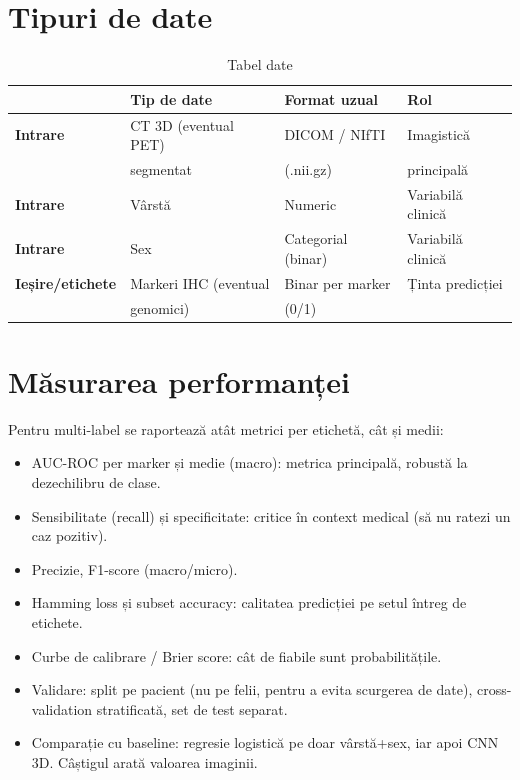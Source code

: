 \documentclass[runningheads,a4paper,11pt]{report}
\begin{document}
\section{Tipuri de date}
\begin{table}[htbp]
    \centering
    \renewcommand{\arraystretch}{1.5}
    \begin{tabular}{llll}
        \toprule
        & \textbf{Tip de date} & \textbf{Format uzual} & \textbf{Rol} \\
        \midrule
        \textbf{Intrare} & CT 3D (eventual PET) & DICOM / NIfTI & Imagistică \\
                         & segmentat            & (.nii.gz)     & principală \\
        \midrule
        \textbf{Intrare} & Vârstă               & Numeric       & Variabilă clinică \\
        \midrule
        \textbf{Intrare} & Sex                  & Categorial (binar) & Variabilă clinică \\
        \midrule
        \textbf{Ieșire/etichete} & Markeri IHC (eventual & Binar per marker & Ținta predicției \\
                                 & genomici)             & (0/1)            & \\
        \bottomrule
    \end{tabular}
    \caption{Tabel date}
    \label{tab:date}
\end{table}

\section{Măsurarea performanței}
Pentru multi-label se raportează atât metrici per etichetă, cât și medii:
\begin{itemize}
    \item AUC-ROC per marker și medie (macro): metrica principală, robustă la dezechilibru de clase.
    \item Sensibilitate (recall) și specificitate: critice în context medical (să nu ratezi un caz pozitiv).
    \item Precizie, F1-score (macro/micro).
    \item Hamming loss și subset accuracy: calitatea predicției pe setul întreg de etichete.
    \item Curbe de calibrare / Brier score: cât de fiabile sunt probabilitățile.
    \item Validare: split pe pacient (nu pe felii, pentru a evita scurgerea de date), cross-validation stratificată, set de test separat.
    \item Comparație cu baseline: regresie logistică pe doar vârstă+sex, iar apoi CNN 3D. Câștigul arată valoarea imaginii.
\end{itemize}
\end{document}
